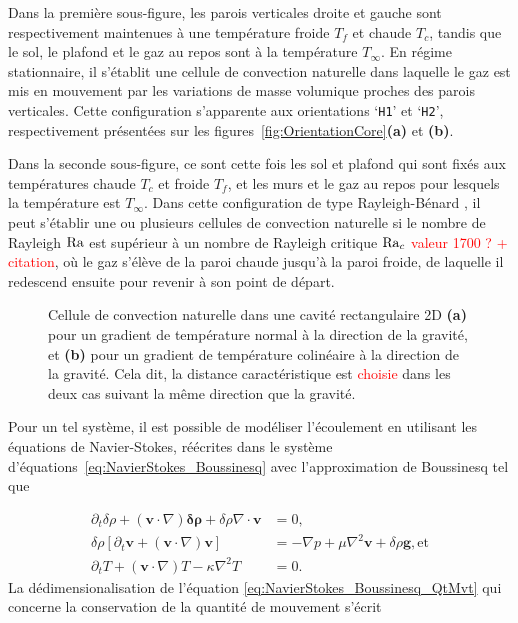 Dans la première sous-figure, les parois verticales droite et gauche sont respectivement maintenues à une température froide $T_f$ et chaude $T_c$, tandis que le sol, le plafond et le gaz au repos sont à la température $T_\infty$. En régime stationnaire, il s'établit une cellule de convection naturelle dans laquelle le gaz est mis en mouvement par les  variations de masse volumique proches des parois verticales. Cette configuration s'apparente aux orientations `\texttt{H1}' et `\texttt{H2}', respectivement présentées sur les figures~\ref{fig:OrientationCore}\textbf{(a)} et \textbf{(b)}.

Dans la seconde sous-figure, ce sont cette fois les sol et plafond qui sont fixés aux températures chaude $T_c$ et froide $T_f$, et les murs et le gaz au repos pour lesquels la température est $T_\infty$. Dans cette configuration de type \og Rayleigh-Bénard \fg{} , il peut s'établir une ou plusieurs cellules de convection naturelle si le nombre de Rayleigh $\mathrm{Ra}$ est supérieur à un nombre de Rayleigh critique $\mathrm{Ra}_c$ \textcolor{red}{valeur 1700 ? + citation}, où le gaz s'élève de la paroi chaude jusqu'à la paroi froide, de laquelle il redescend ensuite pour revenir à son point de départ.

\begin{figure}[!ht]
    \centering
    
    \caption{Cellule de convection naturelle dans une cavité rectangulaire 2D \textbf{(a)} pour un gradient de température normal à la direction de la gravité, et \textbf{(b)} pour un gradient de température colinéaire à la direction de la gravité. Cela dit, la distance caractéristique est \textcolor{red}{choisie} dans les deux cas suivant la même direction que la gravité.}
    \label{fig:SimuConvNat2D}
\end{figure}



Pour un tel système, il est possible de modéliser l'écoulement en utilisant les équations de Navier-Stokes, réécrites dans le système d'équations~\eqref{eq:NavierStokes_Boussinesq} avec l'approximation de Boussinesq tel que

\begin{subequations}
	\begin{align}
		\partial_t \delta\rho + (\mathbf v \cdot \nabla)\mathbf{\delta\rho} + \delta\rho \nabla \cdot \mathbf{v} &= 0, \label{eq:NavierStokes_Boussinesq_Conti}\\
		\delta\rho [\partial_t \mathbf v + (\mathbf v \cdot \nabla)\mathbf v] &= -\nabla p + \mu \nabla^2 \mathbf v + \delta\rho \mathbf g, \text{et}\label{eq:NavierStokes_Boussinesq_QtMvt}\\
		\partial_t T + (\mathbf v \cdot \nabla) T - \kappa\nabla^2T &= 0. \label{eq:NavierStokes_Boussinesq_NRJinterne}
	\end{align}
	\label{eq:NavierStokes_Boussinesq}%
\end{subequations}
La dédimensionalisation de l'équation \eqref{eq:NavierStokes_Boussinesq_QtMvt} qui concerne la conservation de la quantité de mouvement s'écrit

